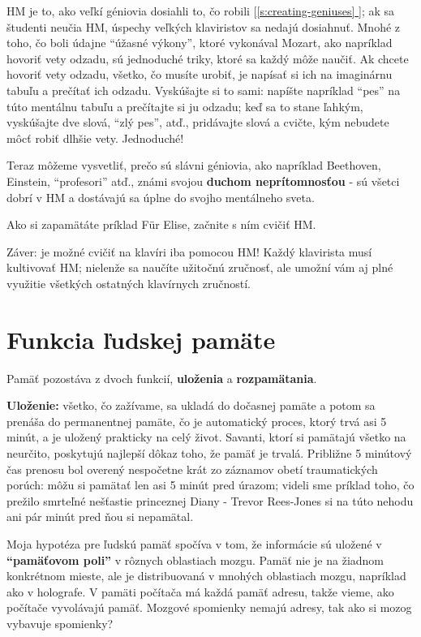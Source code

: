 \documentclass[11pt,a4paper]{book}
\newcommand*{\fullref}[1]{\hyperref[{#1}]{\ref*{#1} \nameref*{#1}}} %
\newcommand*{\fullrefp}[1]{[\fullref{#1}]} %
\begin{document}
HM je to, ako veľkí géniovia dosiahli to, čo robili \fullrefp{s:creating-geniuses}; ak sa študenti neučia HM, úspechy veľkých klaviristov sa nedajú dosiahnuť. Mnohé z toho, čo boli údajne “úžasné výkony”, ktoré vykonával Mozart, ako napríklad hovoriť vety odzadu, sú jednoduché triky, ktoré sa každý môže naučiť. Ak chcete hovoriť vety odzadu, všetko, čo musíte urobiť, je napísať si ich na imaginárnu tabuľu a prečítať ich odzadu. Vyskúšajte si to sami: napíšte napríklad “pes” na túto mentálnu tabuľu a prečítajte si ju odzadu; keď sa to stane ľahkým, vyskúšajte dve slová, “zlý pes”, atď., pridávajte slová a cvičte, kým nebudete môcť robiť dlhšie vety. Jednoduché!

Teraz môžeme vysvetliť, prečo sú slávni géniovia, ako napríklad Beethoven, Einstein, “profesori” atď., známi svojou \textbf{duchom neprítomnosťou} - sú všetci dobrí v HM a dostávajú sa úplne do svojho mentálneho sveta.

Ako si zapamätáte príklad Für Elise, začnite s ním cvičiť HM.

Záver: je možné cvičiť na klavíri iba pomocou HM! Každý klavirista musí kultivovať HM; nielenže sa naučíte užitočnú zručnosť, ale umožní vám aj plné využitie všetkých ostatných klavírnych zručností.

\section{Funkcia ľudskej pamäte}\label{s:human-function}
Pamäť pozostáva z dvoch funkcií, \textbf{uloženia} a \textbf{rozpamätania}.

\textbf{Uloženie:} všetko, čo zažívame, sa ukladá do dočasnej pamäte a potom sa prenáša do permanentnej pamäte, čo je automatický proces, ktorý trvá asi 5 minút, a je uložený prakticky na celý život. Savanti, ktorí si pamätajú všetko na neurčito, poskytujú najlepší dôkaz toho, že pamäť je trvalá. Približne 5 minútový čas prenosu bol overený nespočetne krát zo záznamov obetí traumatických porúch: môžu si pamätať len asi 5 minút pred úrazom; videli sme príklad toho, čo prežilo smrteľné nešťastie princeznej Diany - Trevor Rees-Jones si na túto nehodu ani pár minút pred ňou si nepamätal.

Moja hypotéza pre ľudskú pamäť spočíva v tom, že informácie sú uložené v \textbf{“pamäťovom poli”} v rôznych oblastiach mozgu. Pamäť nie je na žiadnom konkrétnom mieste, ale je distribuovaná v mnohých oblastiach mozgu, napríklad ako v holografe. V pamäti počítača má každá pamäť adresu, takže vieme, ako počítače vyvolávajú pamäť. Mozgové spomienky nemajú adresy, tak ako si mozog vybavuje spomienky?
\end{document}
